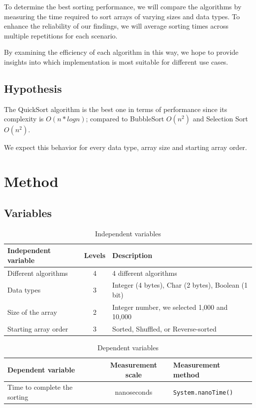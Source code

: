 \documentclass{article}
\begin{document}
To determine the best sorting performance, we will compare the algorithms by measuring the time required to sort arrays of varying sizes and data types. To enhance the reliability of our findings, we will average sorting times across multiple repetitions for each scenario.

By examining the efficiency of each algorithm in this way, we hope to provide insights into which implementation is most suitable for different use cases.

\subsection*{Hypothesis}
The QuickSort algorithm is the best one in terms of performance since its complexity is $O(n*logn)$; compared to BubbleSort $O(n^2)$ and Selection Sort $O(n^2)$.

We expect this behavior for every data type, array size and starting array order.

\newpage

\section{Method}
\subsection{Variables}
\begin{table}[h!]
    \centering
    \begin{tabular}{l|c|l}
        \textbf{Independent variable} & \textbf{Levels} & \textbf{Description}                               \\ \hline
        Different algorithms          & 4               & 4 different algorithms                             \\
        Data types                    & 3               & Integer (4 bytes), Char (2 bytes), Boolean (1 bit) \\
        Size of the array             & 2               & Integer number, we selected 1,000 and 10,000       \\
        Starting array order          & 3               & Sorted, Shuffled, or Reverse-sorted                \\
    \end{tabular}
    \caption{Independent variables}
\end{table}

\begin{table}[h!]
    \centering
    \begin{tabular}{l|c|l}
        \textbf{Dependent variable}  & \textbf{Measurement scale} & \textbf{Measurement method} \\
        \hline
        Time to complete the sorting & nanoseconds                & \texttt{System.nanoTime()}  \\
    \end{tabular}
    \caption{Dependent variables}
\end{table}
\end{document}

